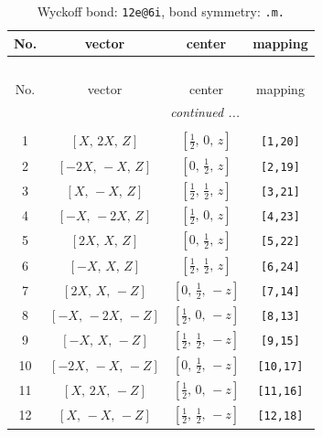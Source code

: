 \documentclass[fleqn,8pt]{jsarticle}
\begin{document}
\renewcommand{\arraystretch}{1.2}
\begin{longtable}{cccc}
\caption{Wyckoff bond: {\tt 12e@6i}, bond symmetry: {\tt .m.}}
 \\
 \hline \hline
No. & vector & center & mapping \\ \hline \endfirsthead

\multicolumn{3}{l}{\tablename\ \thetable{}} \\
 \hline \hline
No. & vector & center & mapping \\ \hline \endhead

 \hline \hline
\multicolumn{3}{r}{\footnotesize\it continued ...} \\ \endfoot

 \hline \hline
\multicolumn{3}{r}{} \\ \endlastfoot

1 & $\left[ X,\, 2 X,\, Z \right]$ & $\left[ \frac{1}{2},\, 0,\, z \right]$ & {\tt [1,20]} \\ \hline
2 & $\left[ - 2 X,\, - X,\, Z \right]$ & $\left[ 0,\, \frac{1}{2},\, z \right]$ & {\tt [2,19]} \\ \hline
3 & $\left[ X,\, - X,\, Z \right]$ & $\left[ \frac{1}{2},\, \frac{1}{2},\, z \right]$ & {\tt [3,21]} \\ \hline
4 & $\left[ - X,\, - 2 X,\, Z \right]$ & $\left[ \frac{1}{2},\, 0,\, z \right]$ & {\tt [4,23]} \\ \hline
5 & $\left[ 2 X,\, X,\, Z \right]$ & $\left[ 0,\, \frac{1}{2},\, z \right]$ & {\tt [5,22]} \\ \hline
6 & $\left[ - X,\, X,\, Z \right]$ & $\left[ \frac{1}{2},\, \frac{1}{2},\, z \right]$ & {\tt [6,24]} \\ \hline
7 & $\left[ 2 X,\, X,\, - Z \right]$ & $\left[ 0,\, \frac{1}{2},\, - z \right]$ & {\tt [7,14]} \\ \hline
8 & $\left[ - X,\, - 2 X,\, - Z \right]$ & $\left[ \frac{1}{2},\, 0,\, - z \right]$ & {\tt [8,13]} \\ \hline
9 & $\left[ - X,\, X,\, - Z \right]$ & $\left[ \frac{1}{2},\, \frac{1}{2},\, - z \right]$ & {\tt [9,15]} \\ \hline
10 & $\left[ - 2 X,\, - X,\, - Z \right]$ & $\left[ 0,\, \frac{1}{2},\, - z \right]$ & {\tt [10,17]} \\ \hline
11 & $\left[ X,\, 2 X,\, - Z \right]$ & $\left[ \frac{1}{2},\, 0,\, - z \right]$ & {\tt [11,16]} \\ \hline
12 & $\left[ X,\, - X,\, - Z \right]$ & $\left[ \frac{1}{2},\, \frac{1}{2},\, - z \right]$ & {\tt [12,18]} \\
\end{longtable}
\end{document}

